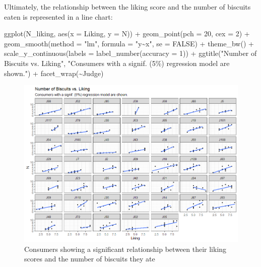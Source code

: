 \documentclass[
]{krantz}
\makeatletter
\newenvironment{Shaded}{\begin{snugshade}}{\end{snugshade}}
\newcommand{\AttributeTok}[1]{\textcolor[rgb]{0.61,0.61,0.61}{#1}}
\newcommand{\ConstantTok}[1]{\textcolor[rgb]{0,0,0}{#1}}
\newcommand{\DecValTok}[1]{\textcolor[rgb]{0.06,0.06,0.06}{#1}}
\newcommand{\FunctionTok}[1]{\textcolor[rgb]{0,0,0}{#1}}
\newcommand{\NormalTok}[1]{#1}
\newcommand{\SpecialCharTok}[1]{\textcolor[rgb]{0,0,0}{#1}}
\newcommand{\StringTok}[1]{\textcolor[rgb]{0.5,0.5,0.5}{#1}}
\newenvironment{kframe}{%
\medskip{}
\setlength{\fboxsep}{.8em}
 \def\at@end@of@kframe{}%
 \ifinner\ifhmode%
  \def\at@end@of@kframe{\end{minipage}}%
  \begin{minipage}{\columnwidth}%
 \fi\fi%
 \def\FrameCommand##1{\hskip\@totalleftmargin \hskip-\fboxsep
 \colorbox{shadecolor}{##1}\hskip-\fboxsep
     \hskip-\linewidth \hskip-\@totalleftmargin \hskip\columnwidth}%
 \MakeFramed {\advance\hsize-\width
   \@totalleftmargin\z@ \linewidth\hsize
   \@setminipage}}%
 {\par\unskip\endMakeFramed%
 \at@end@of@kframe}
\renewenvironment{Shaded}{\begin{kframe}}{\end{kframe}}
\makeatother
\begin{document}
Ultimately, the relationship between the liking score and the number of biscuits eaten is represented in a line chart:

\begin{Shaded}
\begin{Highlighting}[]
\FunctionTok{ggplot}\NormalTok{(N\_liking, }\FunctionTok{aes}\NormalTok{(}\AttributeTok{x =}\NormalTok{ Liking, }\AttributeTok{y =}\NormalTok{ N)) }\SpecialCharTok{+}
  \FunctionTok{geom\_point}\NormalTok{(}\AttributeTok{pch =} \DecValTok{20}\NormalTok{, }\AttributeTok{cex =} \DecValTok{2}\NormalTok{) }\SpecialCharTok{+}
  \FunctionTok{geom\_smooth}\NormalTok{(}\AttributeTok{method =} \StringTok{"lm"}\NormalTok{, }\AttributeTok{formula =} \StringTok{"y\textasciitilde{}x"}\NormalTok{, }\AttributeTok{se =} \ConstantTok{FALSE}\NormalTok{) }\SpecialCharTok{+}
  \FunctionTok{theme\_bw}\NormalTok{() }\SpecialCharTok{+}
  \FunctionTok{scale\_y\_continuous}\NormalTok{(}\AttributeTok{labels =} \FunctionTok{label\_number}\NormalTok{(}\AttributeTok{accuracy =} \DecValTok{1}\NormalTok{)) }\SpecialCharTok{+}
  \FunctionTok{ggtitle}\NormalTok{(}\StringTok{"Number of Biscuits vs. Liking"}\NormalTok{, }
          \StringTok{"Consumers with a signif. (5\%) regression model are shown."}\NormalTok{) }\SpecialCharTok{+}
  \FunctionTok{facet\_wrap}\NormalTok{(}\SpecialCharTok{\textasciitilde{}}\NormalTok{Judge)}
\end{Highlighting}
\end{Shaded}

\begin{figure}
\includegraphics[width=12.43in]{images/Scatter_eating_vs_liking} \caption{Consumers showing a significant relationship between their liking scores and the number of biscuits they ate}\label{fig:unnamed-chunk-291}
\end{figure}
\end{document}
